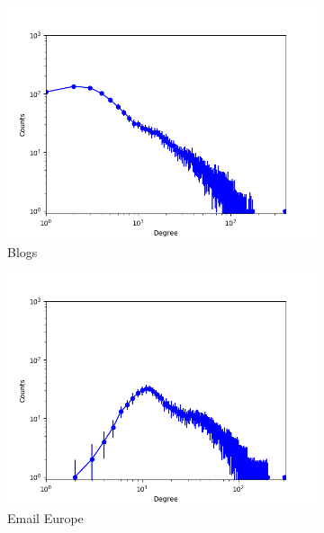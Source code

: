 \begin{figure}[h]
\begin{subfigure}[b]{0.300\textwidth}
            \includegraphics[width=\textwidth]{img/corpus/immsb_blogs_0}
            \caption {{\small Blogs}}    
            \label{fig:mean and std of net14}
        \end{subfigure}
        \begin{subfigure}[b]{0.300\textwidth}
            \centering
            \includegraphics[width=\textwidth]{img/corpus/immsb_emaileu_0}
            \caption {{\small Email Europe}}    
            \label{fig:mean and std of net14}
        \end{subfigure}
        \begin{subfigure}[b]{0.300\textwidth}
            \centering

\end{subfigure}
\end{figure}
